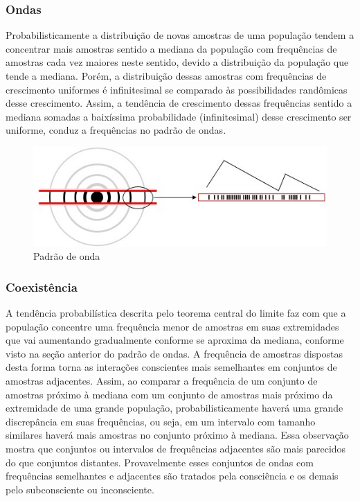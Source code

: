 \subsubsection{Ondas}
Probabilisticamente a distribuição de novas amostras de uma população tendem a concentrar mais amostras sentido a mediana da população com frequências de amostras cada vez maiores neste sentido, devido a distribuição da população que tende a mediana. Porém, a distribuição dessas amostras com frequências de crescimento uniformes é infinitesimal se comparado às possibilidades randômicas desse crescimento. Assim, a tendência de crescimento dessas frequências sentido a mediana somadas a baixíssima probabilidade (infinitesimal) desse crescimento ser uniforme, conduz a frequências no padrão de ondas.

\begin{figure}[H]
\caption{Padrão de onda}
\label{fig:consciousness_waves}
\centering
\includegraphics[scale=1]{sections/images/consciousness_waves.jpg}
\end{figure}

\subsubsection{Coexistência}
A tendência probabilística descrita pelo teorema central do limite faz com que a população concentre uma frequência menor de amostras em suas extremidades que vai aumentando gradualmente conforme se aproxima da mediana, conforme visto na seção anterior do padrão de ondas. A frequência de amostras dispostas desta forma torna as interações conscientes mais semelhantes em conjuntos de amostras adjacentes. Assim, ao comparar a frequência de um conjunto de amostras próximo à mediana com um conjunto de amostras mais próximo da extremidade de uma grande população, probabilisticamente haverá uma grande discrepância em suas frequências, ou seja, em um intervalo com tamanho similares haverá mais amostras no conjunto próximo à mediana. Essa observação mostra que conjuntos ou intervalos de frequências adjacentes são mais parecidos do que conjuntos distantes. Provavelmente esses conjuntos de ondas com frequências semelhantes e adjacentes são tratados pela consciência e os demais pelo subconsciente ou inconsciente. 

